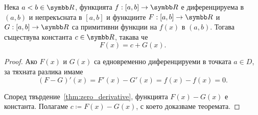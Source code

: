 \documentclass[numbers=endperiod, bibliography=totocnumbered]{scrartcl}
\begin{document}
\begin{theorem}
Нека \( a < b \in \R \), функцията \( f: [a, b] \to \R \) е диференцируема в \( (a, b) \) и непрекъсната в \( [a, b] \) и функциите \( F: [a, b] \to \R \) и \( G: [a, b] \to \R \) са примитивни функции на \( f(x) \) в \( (a, b) \). Тогава съществува константа \( c \in \R \), такава че
  \begin{equation*}
    F(x) = c + G(x).
  \end{equation*}
\end{theorem}
\begin{proof}
  Ако \( F(x) \) и \( G(x) \) са едновременно диференцируеми в точката \( a \in D \), за тяхната разлика имаме
  \begin{equation*}
    (F - G)'(x)
    =
    F'(x) - G'(x)
    =
    f(x) - f(x)
    =
    0.
  \end{equation*}

  Според твърдение~\ref{thm:zero_derivative}, функцията \( F(x) - G(x) \) е константа. Полагаме \( c \coloneqq F(x) - G(x) \), с което доказваме теоремата.
\end{proof}

\printbibliography
\end{document}
